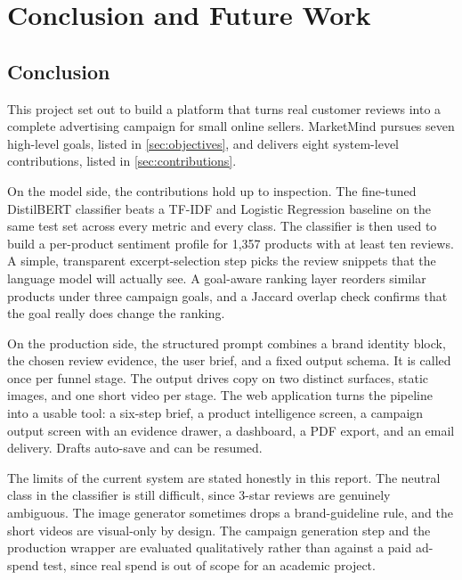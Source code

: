 \documentclass[12pt,a4paper]{report}
\begin{document}
\chapter{Conclusion and Future Work}
\label{ch:conclusion}

\section{Conclusion}
\label{sec:conclusion}

This project set out to build a platform that turns real customer reviews into a complete advertising campaign for small online sellers. MarketMind pursues seven high-level goals, listed in \cref{sec:objectives}, and delivers eight system-level contributions, listed in \cref{sec:contributions}.

On the model side, the contributions hold up to inspection. The fine-tuned DistilBERT classifier beats a TF-IDF and Logistic Regression baseline on the same test set across every metric and every class. The classifier is then used to build a per-product sentiment profile for 1,357 products with at least ten reviews. A simple, transparent excerpt-selection step picks the review snippets that the language model will actually see. A goal-aware ranking layer reorders similar products under three campaign goals, and a Jaccard overlap check confirms that the goal really does change the ranking.

On the production side, the structured prompt combines a brand identity block, the chosen review evidence, the user brief, and a fixed output schema. It is called once per funnel stage. The output drives copy on two distinct surfaces, static images, and one short video per stage. The web application turns the pipeline into a usable tool: a six-step brief, a product intelligence screen, a campaign output screen with an evidence drawer, a dashboard, a PDF export, and an email delivery. Drafts auto-save and can be resumed.

The limits of the current system are stated honestly in this report. The neutral class in the classifier is still difficult, since 3-star reviews are genuinely ambiguous. The image generator sometimes drops a brand-guideline rule, and the short videos are visual-only by design. The campaign generation step and the production wrapper are evaluated qualitatively rather than against a paid ad-spend test, since real spend is out of scope for an academic project.
\end{document}
